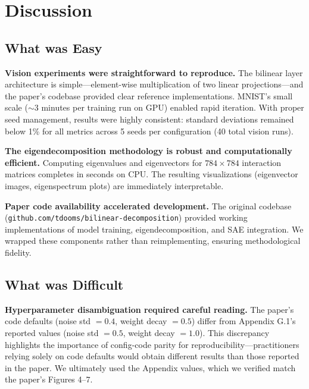 
\section{Discussion}
\label{sec:discussion}

\subsection{What was Easy}
\label{sec:easy}

\textbf{Vision experiments were straightforward to reproduce.}
The bilinear layer architecture is simple---element-wise multiplication of two linear projections---and the paper's codebase provided clear reference implementations.
MNIST's small scale ($\sim$3 minutes per training run on GPU) enabled rapid iteration.
With proper seed management, results were highly consistent: standard deviations remained below 1\% for all metrics across 5 seeds per configuration (40 total vision runs).

\textbf{The eigendecomposition methodology is robust and computationally efficient.}
Computing eigenvalues and eigenvectors for $784 \times 784$ interaction matrices completes in seconds on CPU.
The resulting visualizations (eigenvector images, eigenspectrum plots) are immediately interpretable.

\textbf{Paper code availability accelerated development.}
The original codebase (\texttt{github.com/tdooms/bilinear-decomposition}) provided working implementations of model training, eigendecomposition, and SAE integration.
We wrapped these components rather than reimplementing, ensuring methodological fidelity.

\subsection{What was Difficult}
\label{sec:difficult}

\textbf{Hyperparameter disambiguation required careful reading.}
The paper's code defaults (noise std $= 0.4$, weight decay $= 0.5$) differ from Appendix G.1's reported values (noise std $= 0.5$, weight decay $= 1.0$).
This discrepancy highlights the importance of config-code parity for reproducibility---practitioners relying solely on code defaults would obtain different results than those reported in the paper.
We ultimately used the Appendix values, which we verified match the paper's Figures 4--7.

